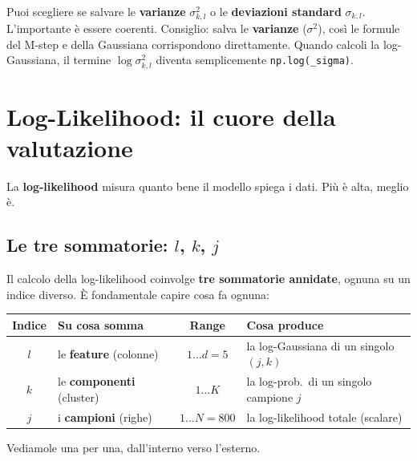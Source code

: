 \documentclass[11pt,a4paper]{article}
\begin{document}
\begin{infobox}
Puoi scegliere se salvare le \textbf{varianze} $\sigma_{k,l}^2$ o le \textbf{deviazioni standard} $\sigma_{k,l}$. L'importante \`e essere coerenti. Consiglio: salva le \textbf{varianze} ($\sigma^2$), cos\`i le formule del M-step e della Gaussiana corrispondono direttamente. Quando calcoli la log-Gaussiana, il termine $\log \sigma_{k,l}^2$ diventa semplicemente \texttt{np.log(\_sigma)}.
\end{infobox}

\section{Log-Likelihood: il cuore della valutazione}

La \textbf{log-likelihood} misura quanto bene il modello spiega i dati. Pi\`u \`e alta, meglio \`e.

\subsection{Le tre sommatorie: $l$, $k$, $j$}

Il calcolo della log-likelihood coinvolge \textbf{tre sommatorie annidate}, ognuna su un indice diverso. \`E fondamentale capire cosa fa ognuna:

\begin{center}
\begin{tabular}{clcl}
    \toprule
    \textbf{Indice} & \textbf{Su cosa somma} & \textbf{Range} & \textbf{Cosa produce} \\
    \midrule
    $l$ & le \textbf{feature} (colonne) & $1 \ldots d = 5$ & la log-Gaussiana di un singolo $(j, k)$ \\
    $k$ & le \textbf{componenti} (cluster) & $1 \ldots K$ & la log-prob.\ di un singolo campione $j$ \\
    $j$ & i \textbf{campioni} (righe) & $1 \ldots N = 800$ & la log-likelihood totale (scalare) \\
    \bottomrule
\end{tabular}
\end{center}

Vediamole una per una, dall'interno verso l'esterno.
\end{document}

